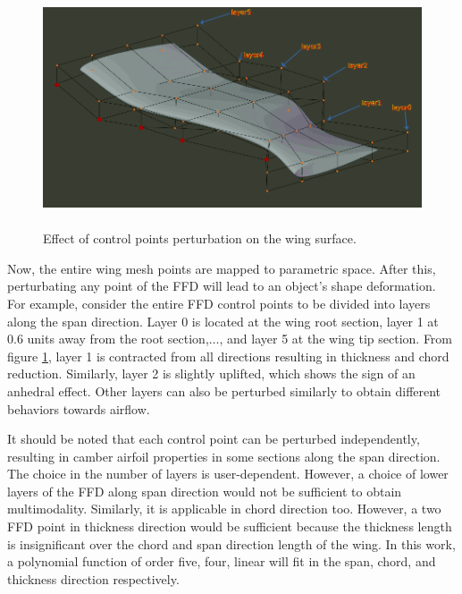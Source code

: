 \begin{figure}
    \centering
    \includegraphics[height = 70mm, width=\textwidth]{figures/wing_FFD-_displaced.png}
    \caption{Effect of control points perturbation on the wing surface.}
    \label{ffd_box_perturbed}
\end{figure}
Now, the entire wing mesh points are mapped to parametric space. After this, perturbating any point of the FFD will lead to an object's shape deformation. For example, consider the entire FFD control points to be divided into layers along the span direction. Layer 0 is located at the wing root section, layer 1 at 0.6 units away from the root section,$ \dots $, and layer 5 at the wing tip section. From figure \ref{ffd_box_perturbed}, layer 1 is contracted from all directions resulting in thickness and chord reduction. Similarly, layer 2 is slightly uplifted, which shows the sign of an anhedral effect. Other layers can also be perturbed similarly to obtain different behaviors towards airflow.

It should be noted that each control point can be perturbed independently, resulting in camber airfoil properties in some sections along the span direction. The choice in the number of layers is user-dependent. However, a choice of lower layers of the FFD along span direction would not be sufficient to obtain multimodality. Similarly, it is applicable in chord direction too. However, a two FFD point in thickness direction would be sufficient because the thickness length is insignificant over the chord and span direction length of the wing. In this work, a polynomial function of order five, four, linear will fit in the span, chord, and thickness direction respectively.

